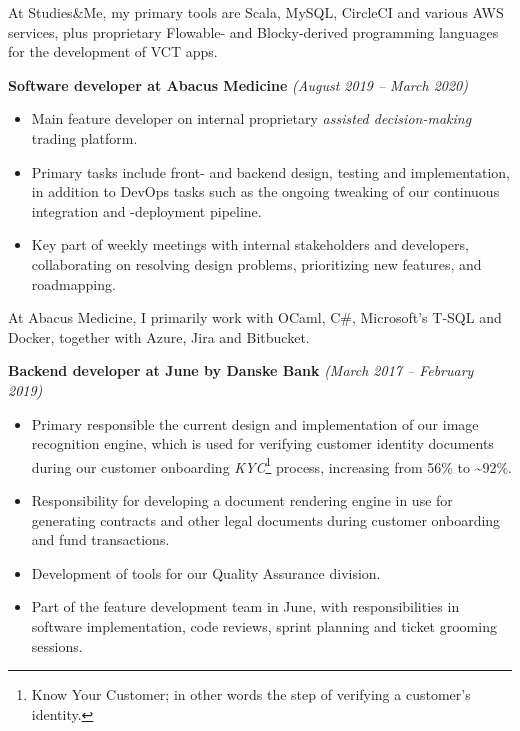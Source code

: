 \documentclass[10pt, a4paper]{article}
\begin{document}
At Studies\&Me, my primary tools are Scala, MySQL, CircleCI and various AWS services, plus proprietary Flowable- and Blocky-derived programming languages for the development of VCT apps.

\textbf{Software developer at Abacus Medicine} \textit{(August 2019 -- March 2020)}
  \begin{itemize}[topsep=0pt]
  \item Main feature developer on internal proprietary \textit{assisted
      decision-making} trading platform.

  \item Primary tasks include front- and backend design, testing and
    implementation, in addition to DevOps tasks such as the ongoing tweaking
    of our continuous integration and -deployment pipeline.

  \item Key part of weekly meetings with internal stakeholders and developers, collaborating
    on resolving design problems, prioritizing new features, and roadmapping. 
  \end{itemize}

  At Abacus Medicine, I primarily work with OCaml, C\#, Microsoft's T-SQL and
  Docker, together with Azure, Jira and Bitbucket.

  \pagebreak
\textbf{Backend developer at June by Danske Bank} \textit{(March 2017 -- February 2019)}
  \begin{itemize}[topsep=0pt]
  \item Primary responsible the current design and
  implementation of our image recognition engine, which is used for
  verifying customer identity documents during our customer onboarding
  \textit{KYC}\footnote{Know Your Customer; in other words the step of verifying a
    customer's identity.} process, increasing from 56\% to \textasciitilde 92\%.

  \item Responsibility for developing a document rendering
  engine in use for generating contracts and other legal documents
  during customer onboarding and fund transactions.

  \item Development of tools for our Quality Assurance division. 

  \item Part of the feature development team in June, with responsibilities in 
  software implementation, code reviews, sprint planning and
  ticket grooming sessions.
  \end{itemize}
\end{document}
